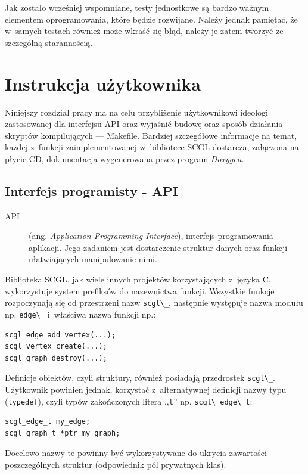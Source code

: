 \documentclass[a4paper,12pt,polish,twoside,openright]{thesis}
\newcommand\code[1]{\lstinline[style=line]{#1}}
\begin{document}
Jak zostało wcześniej wspomniane, testy jednostkowe są bardzo ważnym elementem oprogramowania, które będzie rozwijane.
Należy jednak pamiętać, że w~samych testach również może wkraść się błąd, należy je zatem tworzyć ze szczególną starannością.

\section{Instrukcja użytkownika}
Niniejszy rozdział pracy ma na celu przybliżenie użytkownikowi ideologi zastosowanej dla interfejsu API oraz wyjaśnić budowę oraz sposób działania skryptów kompilujących --- Makefile.
Bardziej szczegółowe informacje na temat, każdej z~funkcji zaimplementowanej w~bibliotece SCGL dostarcza, załączona na płycie CD, dokumentacja wygenerowana przez program \emph{Doxygen}.

\subsection{Interfejs programisty - API}
\label{chap:api}
\begin{description}
	\item[API] (ang. \emph{Application Programming Interface}), interfejs programowania aplikacji. Jego zadaniem jest dostarczenie struktur danych oraz funkcji ułatwiających manipulowanie nimi\cite{dejagnu}.
\end{description}
Biblioteka SCGL, jak wiele innych projektów korzystających z~języka C, wykorzystuje system prefiksów do nazewnictwa funkcji.
Wszystkie funkcje rozpoczynają się od przestrzeni nazw \code{scgl\_}, następnie występuje nazwa modułu np. \code{edge\_} i~właściwa nazwa funkcji np.:
\begin{lstlisting}[style=coden,caption=Przykłady przestrzeni nazw biblioteki SCGL,label=lst:funsuffix]
scgl_edge_add_vertex(...);
scgl_vertex_create(...);
scgl_graph_destroy(...);
\end{lstlisting}

Definicje obiektów, czyli struktury, również posiadają przedrostek \code{scgl\_}.
Użytkownik powinien jednak, korzystać z~alternatywnej definicji nazwy typu (\code{typedef}), czyli typów zakończonych literą ,,\code{t}'' np. \code{scgl\_edge\_t}:
\begin{lstlisting}[style=coden]
scgl_edge_t my_edge;
scgl_graph_t *ptr_my_graph;
\end{lstlisting}
Docelowo nazwy te powinny być wykorzystywane do ukrycia zawartości poszczególnych struktur (odpowiednik pól prywatnych klas).
\end{document}
